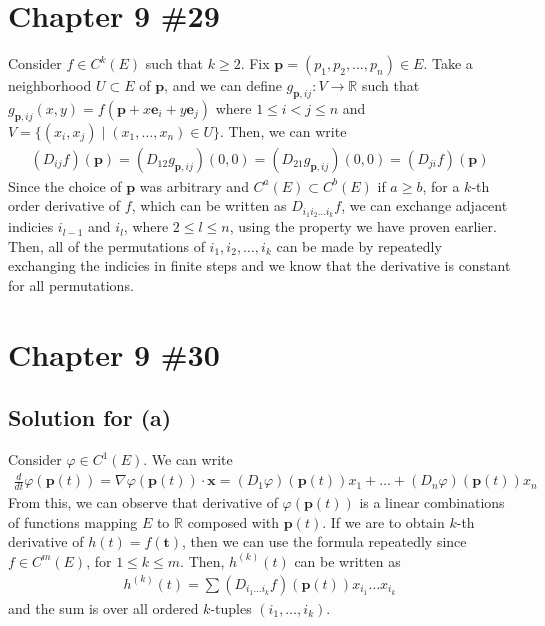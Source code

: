 \documentclass{scrartcl}
\begin{document}
\section{Chapter 9 \#29}
Consider \(f \in C^k(E)\) such that \(k \ge 2\). Fix \(\mathbf{p} = (p_1, p_2,
\dots, p_n) \in E\). Take a neighborhood \(U \subset E\) of \(\mathbf{p}\), and
we can define \(g_{\mathbf{p}, ij}: V \to \mathbb{R}\) such that
\(g_{\mathbf{p}, ij}(x, y) = f(\mathbf{p} + x \mathbf{e}_i + y \mathbf{e}_j)\)
where \(1 \le i < j \le n\) and \(V = \{(x_i, x_j)\; |\; (x_1, \dots, x_n) \in
U\}\). Then, we can write
\begin{align*}
  (D_{ij} f) (\mathbf{p})
  = (D_{12} g_{\mathbf{p}, ij}) (0, 0)
  = (D_{21} g_{\mathbf{p}, ij}) (0, 0)
  = (D_{ji} f) (\mathbf{p})
\end{align*}
Since the choice of \(\mathbf{p}\) was arbitrary and \(C^a(E) \subset C^b(E)\)
if \(a \ge b\), for a \(k\)-th order derivative of \(f\), which can be written
as \(D_{i_1 i_2 \dots i_k} f\), we can exchange adjacent indicies \(i_{l - 1}\)
and \(i_l\), where \(2 \le l \le n\), using the property we have proven
earlier. Then, all of the permutations of \(i_1, i_2, \dots, i_k\) can be made
by repeatedly exchanging the indicies in finite steps and we know that the
derivative is constant for all permutations.

\section{Chapter 9 \#30}
\subsection{Solution for (a)}
Consider \(\varphi \in C^1(E)\). We can write
\begin{align*}
  \frac{d}{dt} \varphi(\mathbf{p}(t))
  = \nabla \varphi(\mathbf{p}(t)) \cdot \mathbf{x}
  = (D_1 \varphi) (\mathbf{p}(t)) x_1 + \dots
    + (D_n \varphi) (\mathbf{p}(t)) x_n
\end{align*}
From this, we can observe that derivative of \(\varphi(\mathbf{p}(t))\) is a
linear combinations of functions mapping \(E\) to \(\mathbb{R}\) composed with
\(\mathbf{p}(t)\). If we are to obtain \(k\)-th derivative of \(h(t) =
f(\mathbf{t})\), then we can use the formula repeatedly since \(f \in C^m(E)\),
for \(1 \le k \le m\). Then, \(h^{(k)} (t)\) can be written as
\begin{align*}
  h^{(k)} (t)
  = \sum (D_{i_1 \dots i_k} f) (\mathbf{p}(t)) x_{i_1} \dots x_{i_k}
\end{align*}
and the sum is over all ordered \(k\)-tuples \((i_1, \dots, i_k)\).
\end{document}
